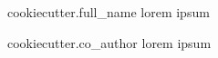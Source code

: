 \begin{IEEEbiographynophoto}{ {{cookiecutter.full_name}} }
lorem ipsum
\end{IEEEbiographynophoto}

\begin{IEEEbiographynophoto}{ {{ cookiecutter.co_author }} }
lorem ipsum
\end{IEEEbiographynophoto}
